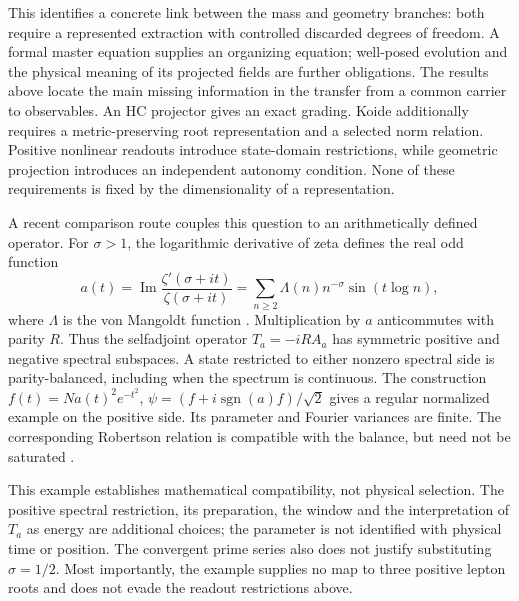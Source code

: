 This identifies a concrete link between the mass and geometry branches:
both require a represented extraction with controlled discarded degrees
of freedom. A formal master equation supplies an organizing equation;
well-posed evolution and the physical meaning of its projected fields
are further obligations.
The results above locate the main missing information in the transfer
from a common carrier to observables. An HC projector gives an exact
grading. Koide additionally requires a metric-preserving root
representation and a selected norm relation. Positive nonlinear
readouts introduce state-domain restrictions, while geometric
projection introduces an independent autonomy condition. None of
these requirements is fixed by the dimensionality of a representation.

A recent comparison route couples this question to an arithmetically
defined operator. For $\sigma>1$, the logarithmic derivative of zeta
defines the real odd function
\begin{equation}
 a(t)=\operatorname{Im}\frac{\zeta'(\sigma+it)}{\zeta(\sigma+it)}
 =\sum_{n\geq2}\Lambda(n)n^{-\sigma}\sin(t\log n),
\end{equation}
where $\Lambda$ is the von Mangoldt function \cite{DLMF274}.
Multiplication by $a$ anticommutes with parity $R$. Thus the
selfadjoint operator $T_a=-iRA_a$ has symmetric positive and negative
spectral subspaces. A state restricted to either nonzero spectral side
is parity-balanced, including when the spectrum is continuous.
The construction $f(t)=Na(t)^2e^{-t^2}$,
$\psi=(f+i\operatorname{sgn}(a)f)/\sqrt2$ gives a regular normalized
example on the positive side. Its parameter and Fourier variances
are finite. The corresponding Robertson relation is compatible with
the balance, but need not be saturated \cite{Robertson1929}.

This example establishes mathematical compatibility, not physical
selection. The positive spectral restriction, its preparation, the
window and the interpretation of $T_a$ as energy are additional
choices; the parameter is not identified with physical time or position.
The convergent prime series also does not justify substituting
$\sigma=1/2$. Most importantly, the example supplies no map to three
positive lepton roots and does not evade the readout restrictions above.

